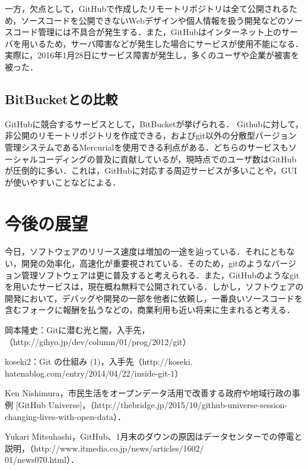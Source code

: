 \documentclass[a4j,9pt,twocolumn]{jsarticle}
\begin{document}
一方，欠点として，GitHubで作成したリモートリポジトリは全て公開されるため，ソースコードを公開できないWebデザインや個人情報を扱う開発などのソースコード管理には不具合が発生する．また，GitHubはインターネット上のサーバを用いるため，サーバ障害などが発生した場合にサービスが使用不能になる．実際に，2016年1月28日にサービス障害が発生し，多くのユーザや企業が被害を被った\cite{news}．

\subsection{BitBucketとの比較}
GitHubに競合するサービスとして，BitBucketが挙げられる． Githubに対して，非公開のリモートリポジトリを作成できる，およびgit以外の分散型バージョン管理システムであるMercurialを使用できる利点がある．どちらのサービスもソーシャルコーディングの普及に貢献しているが，現時点でのユーザ数はGitHubが圧倒的に多い．これは，GitHubに対応する周辺サービスが多いことや，GUIが使いやすいことなどによる．

\section{今後の展望}
今日，ソフトウェアのリリース速度は増加の一途を辿っている．それにともない，開発の効率化，高速化が重要視されている．そのため，gitのようなバージョン管理ソフトウェアは更に普及すると考えられる．また，GitHubのようなgitを用いたサービスは，現在概ね無料で公開されている．しかし，ソフトウェアの開発において，デバッグや開発の一部を他者に依頼し，一番良いソースコードを含むフォークに報酬を払うなどの，商業利用も近い将来に生まれると考える．

\small
\begin{thebibliography}{99}
岡本隆史：Gitに潜む光と闇，入手先，（http://gihyo.jp/dev/column/01/prog/2012/git）

koseki2：Git の仕組み (1)，入手先（http://koseki.\\hatenablog.com/entry/2014/04/22/inside-git-1）

Ken Nishimura，市民生活をオープンデータ活用で改善する政府や地域行政の事例 [GitHub Universe]，（http://thebridge.jp/2015/10/github-universe-session-changing-lives-with-open-data）．

Yukari Mitsuhashi，GitHub、1月末のダウンの原因はデータセンターでの停電と説明，（http://www.itmedia.co.jp/news/articles/1602/\\01/news070.html）．
\end{thebibliography}
\end{document}
